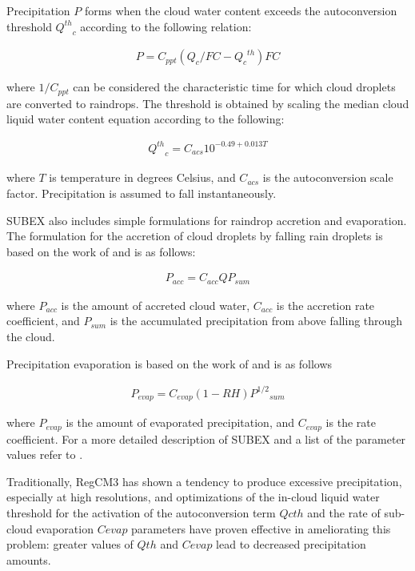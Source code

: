 {Precipitation $P$ forms when the cloud water content exceeds the autoconversion
threshold ${Q^{th}}_c$ according to the following relation:

\begin{eqnarray}
P = C_{ppt}(Q_c/FC - {{Q_c}^{th}})FC
\end{eqnarray}

where $1/C_{ppt}$ can be considered the characteristic time for which
cloud droplets are converted to raindrops.  The threshold is obtained by scaling
the median cloud liquid water content equation according to the following:

\begin{eqnarray}
{Q^{th}}_c = C_{acs} 10^{-0.49 + 0.013T}
\end{eqnarray}

where $T$ is temperature in degrees Celsius, and $C_{acs}$ is the
autoconversion scale factor.  Precipitation is assumed to fall instantaneously.

SUBEX also includes simple formulations for raindrop accretion and evaporation.
The formulation for the accretion of cloud droplets by falling rain droplets is
based on the work of \cite{Beheng_94} and is as follows:

\begin{eqnarray}
P_{acc} = C_{acc} Q P_{sum}
\end{eqnarray}

where $P_{acc}$ is the amount of accreted cloud water, $C_{acc}$ is
the accretion rate coefficient, and $P_{sum}$ is the accumulated precipitation
from above falling through the cloud.  

Precipitation evaporation is based on the work of \cite{Sundqvist_89} and is as
follows

\begin{eqnarray}
P_{evap} = C_{evap} (1-RH) {P^{1/2}}_{sum}
\end{eqnarray}

where $P_{evap}$ is the amount of evaporated precipitation, and
$C_{evap}$ is the rate coefficient.  For a more detailed description of SUBEX
and a list of the parameter values refer to \cite{Pal_00}. 

Traditionally, \ac{RegCM3} has shown a tendency to produce excessive
precipitation, especially at high resolutions, and optimizations of 
the in-cloud liquid water threshold for the activation of the autoconversion
term $Qcth$ and the rate of sub-cloud evaporation $Cevap$ parameters have
proven effective in ameliorating this problem: greater values of $Qth$ and
$Cevap$ lead to decreased precipitation amounts.

}
